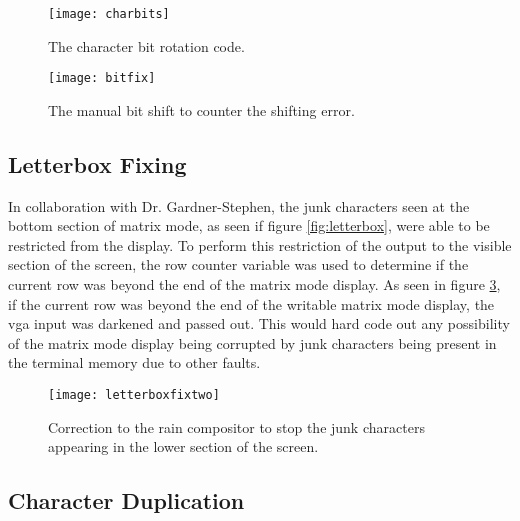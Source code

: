 \begin{figure}
  \centering
  \texttt{[image: charbits]}
  \caption{The character bit rotation code.}
  \label{fig:charbits}
\end{figure}

\begin{figure}
  \centering
  \texttt{[image: bitfix]}
  \caption{The manual bit shift to counter the shifting error.}
  \label{fig:bitfix}
\end{figure}


\subsection{Letterbox Fixing}

\label{Ch5 Sec3 Sub4}

In collaboration with Dr. Gardner-Stephen, the junk characters seen at the bottom section of matrix mode, as seen if figure \ref{fig:letterbox}, were able to be restricted from the display. To perform this restriction of the output to the visible section of the screen, the row counter variable was used to determine if the current row was beyond the end of the matrix mode display. As seen in figure \ref{fig:letterboxfixtwo}, if the current row was beyond the end of the writable matrix mode display, the vga input was darkened and passed out. This would hard code out any possibility of the matrix mode display being corrupted by junk characters being present in the terminal memory due to other faults.

\begin{figure}
  \centering
  \texttt{[image: letterboxfixtwo]}
  \caption{Correction to the rain compositor to stop the junk characters appearing in the lower section of the screen.}
  \label{fig:letterboxfixtwo}
\end{figure}


\subsection{Character Duplication}

\label{Ch5 Sec3 Sub5}

